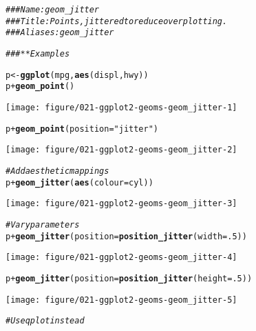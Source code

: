 \documentclass[a4paper,titlepage]{tufte-handout}\usepackage[]{graphicx}\usepackage[]{color}
\makeatletter
\def\maxwidth{ %
  \ifdim\Gin@nat@width>\linewidth
    \linewidth
  \else
    \Gin@nat@width
  \fi
}
\newcommand{\hlnum}[1]{\textcolor[rgb]{0.686,0.059,0.569}{#1}}%
\newcommand{\hlstr}[1]{\textcolor[rgb]{0.192,0.494,0.8}{#1}}%
\newcommand{\hlcom}[1]{\textcolor[rgb]{0.678,0.584,0.686}{\textit{#1}}}%
\newcommand{\hlopt}[1]{\textcolor[rgb]{0,0,0}{#1}}%
\newcommand{\hlstd}[1]{\textcolor[rgb]{0.345,0.345,0.345}{#1}}%
\newcommand{\hlkwb}[1]{\textcolor[rgb]{0.69,0.353,0.396}{#1}}%
\newcommand{\hlkwc}[1]{\textcolor[rgb]{0.333,0.667,0.333}{#1}}%
\newcommand{\hlkwd}[1]{\textcolor[rgb]{0.737,0.353,0.396}{\textbf{#1}}}%
\newenvironment{kframe}{%
 \def\at@end@of@kframe{}%
 \ifinner\ifhmode%
  \def\at@end@of@kframe{\end{minipage}}%
  \begin{minipage}{\columnwidth}%
 \fi\fi%
 \def\FrameCommand##1{\hskip\@totalleftmargin \hskip-\fboxsep
 \colorbox{shadecolor}{##1}\hskip-\fboxsep
     \hskip-\linewidth \hskip-\@totalleftmargin \hskip\columnwidth}%
 \MakeFramed {\advance\hsize-\width
   \@totalleftmargin\z@ \linewidth\hsize
   \@setminipage}}%
 {\par\unskip\endMakeFramed%
 \at@end@of@kframe}
\newenvironment{knitrout}{}{} %
\makeatother
\begin{document}
\begin{knitrout}
\color{fgcolor}\begin{kframe}
\begin{alltt}
\hlcom{### Name: geom_jitter}
\hlcom{### Title: Points, jittered to reduce overplotting.}
\hlcom{### Aliases: geom_jitter}

\hlcom{### ** Examples}

\hlstd{p} \hlkwb{<-} \hlkwd{ggplot}\hlstd{(mpg,} \hlkwd{aes}\hlstd{(displ, hwy))}
\hlstd{p} \hlopt{+} \hlkwd{geom_point}\hlstd{()}
\end{alltt}
\end{kframe}
\texttt{[image: figure/021-ggplot2-geoms-geom\_jitter-1]} 
\begin{kframe}\begin{alltt}
\hlstd{p} \hlopt{+} \hlkwd{geom_point}\hlstd{(}\hlkwc{position} \hlstd{=} \hlstr{"jitter"}\hlstd{)}
\end{alltt}
\end{kframe}
\texttt{[image: figure/021-ggplot2-geoms-geom\_jitter-2]} 
\begin{kframe}\begin{alltt}
\hlcom{# Add aesthetic mappings}
\hlstd{p} \hlopt{+} \hlkwd{geom_jitter}\hlstd{(}\hlkwd{aes}\hlstd{(}\hlkwc{colour} \hlstd{= cyl))}
\end{alltt}
\end{kframe}
\texttt{[image: figure/021-ggplot2-geoms-geom\_jitter-3]} 
\begin{kframe}\begin{alltt}
\hlcom{# Vary parameters}
\hlstd{p} \hlopt{+} \hlkwd{geom_jitter}\hlstd{(}\hlkwc{position} \hlstd{=} \hlkwd{position_jitter}\hlstd{(}\hlkwc{width} \hlstd{=} \hlnum{.5}\hlstd{))}
\end{alltt}
\end{kframe}
\texttt{[image: figure/021-ggplot2-geoms-geom\_jitter-4]} 
\begin{kframe}\begin{alltt}
\hlstd{p} \hlopt{+} \hlkwd{geom_jitter}\hlstd{(}\hlkwc{position} \hlstd{=} \hlkwd{position_jitter}\hlstd{(}\hlkwc{height} \hlstd{=} \hlnum{.5}\hlstd{))}
\end{alltt}
\end{kframe}
\texttt{[image: figure/021-ggplot2-geoms-geom\_jitter-5]} 
\begin{kframe}\begin{alltt}
\hlcom{# Use qplot instead}

\end{alltt}
\end{kframe}
\end{knitrout}
\end{document}
